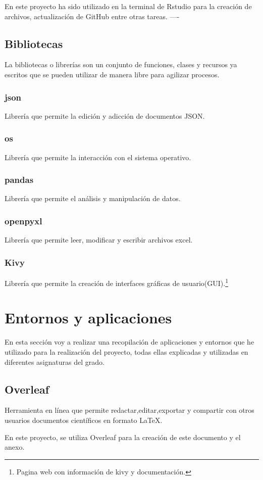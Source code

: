 En este proyecto ha sido utilizado en la terminal de Rstudio para la creación de archivos, actualización de GitHub entre otras tareas.
----
\subsection{Bibliotecas}
La bibliotecas o librerías son un conjunto de funciones, clases y recursos ya escritos que se pueden utilizar de manera libre para agilizar procesos. 

\subsubsection{json}
Librería que permite la edición y adicción de documentos JSON.
\subsubsection{os}
Librería que permite la interacción con el sistema operativo.
\subsubsection{pandas}
Librería que permite el análisis y manipulación de datos.
\subsubsection{openpyxl}
Librería que permite leer, modificar y escribir archivos excel.
\subsubsection{Kivy}
Librería que permite la creación de interfaces gráficas de usuario(GUI).\cite{kivy}\footnote{Pagina web con información de kivy y documentación\cite{kivy}.}
\section{Entornos y aplicaciones}
En esta sección voy a realizar una recopilación de aplicaciones y entornos que he utilizado para la realización del proyecto, todas ellas explicadas y utilizadas en diferentes asignaturas del grado.
\subsection{Overleaf}
Herramienta en línea que permite redactar,editar,exportar y compartir con otros usuarios documentos científicos en formato LaTeX.

En este proyecto, se utiliza Overleaf para la creación de este documento y el anexo.
